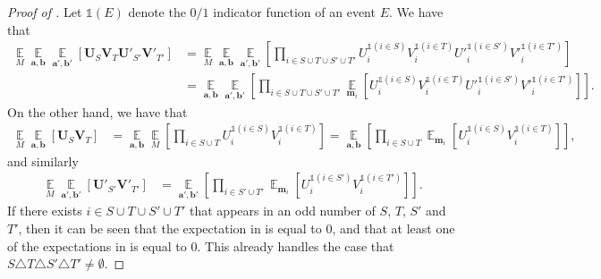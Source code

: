 \documentclass[11pt]{article}
\newcommand{\insquare}[1]{\left [ #1 \right ]}
\DeclareMathOperator*{\Ex}{\mathbb{E}}
\newcommand{\ba}{{\bm a}}
\newcommand{\bb}{{\bm b}}
\newcommand{\m}{{\bm m}}
\newcommand{\bU}{\mathbf{U}}
\newcommand{\bV}{\mathbf{V}}
\begin{document}
\begin{proof}[Proof of ]	
	Let $\mathbb{1}(E)$ denote the $0/1$ indicator function of an event $E$. We have that
	\begin{align}\label{eq:joint}
		\Ex\limits_{M} \Ex\limits_{\ba, \bb} \Ex\limits_{\ba', \bb'} \insquare{\bU_S \bV_T \bU'_{S'} \bV'_{T'}} &= \Ex\limits_{M} \Ex\limits_{\ba, \bb} \Ex\limits_{\ba', \bb'} \insquare{ \prod_{i \in S \cup T \cup S' \cup T'} U_i^{\mathbb{1}(i \in S)} V_i^{\mathbb{1}(i \in T)} {U'}_i^{\mathbb{1}(i \in S')} {V'}_i^{\mathbb{1}(i \in T')}} \nonumber \\ 
		&= \Ex\limits_{\ba, \bb} \Ex\limits_{\ba', \bb'} \insquare{ \prod_{i \in S \cup T \cup S' \cup T'} \Ex\limits_{\m_i} \insquare{ U_i^{\mathbb{1}(i \in S)} V_i^{\mathbb{1}(i \in T)} {U'}_i^{\mathbb{1}(i \in S')} {V'}_i^{\mathbb{1}(i \in T')}}}.
	\end{align}
	On the other hand, we have that
	\begin{align}\label{eq:first_ind}
		\Ex\limits_{M} \Ex\limits_{\ba, \bb} \insquare{\bU_S \bV_T} &= \Ex\limits_{\ba, \bb} \Ex\limits_{M} \insquare{ \prod_{i \in S \cup T} U_i^{\mathbb{1}(i \in S)} V_i^{\mathbb{1}(i \in T)}} = \Ex\limits_{\ba, \bb} \insquare{ \prod_{i \in S \cup T} \Ex_{\m_i} \insquare{U_i^{\mathbb{1}(i \in S)} V_i^{\mathbb{1}(i \in T)}}},
	\end{align}
	and similarly
	\begin{align}\label{eq:sec_ind}
		\Ex\limits_{M} \Ex\limits_{\ba', \bb'} \insquare{\bU'_{S'} \bV'_{T'}} &=  \Ex\limits_{\ba', \bb'} \insquare{ \prod_{i \in S' \cup T'} \Ex_{\m_i} \insquare{U_i^{\mathbb{1}(i \in S')} V_i^{\mathbb{1}(i \in T')}}}.
	\end{align}
	If there exists $i \in S \cup T \cup S' \cup T'$ that appears in an odd number of $S$, $T$, $S'$ and $T'$, then it can be seen that the expectation in  is equal to $0$, and that at least one of the expectations in  is equal to $0$. This already handles the case that $S \triangle T \triangle S' \triangle T' \ne \emptyset$.
	

\end{proof}
\end{document}
